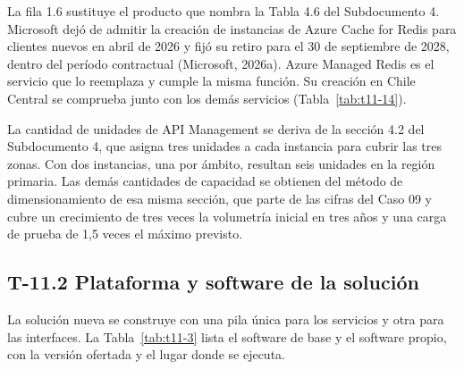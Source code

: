 \documentclass[11pt]{article}
\begin{document}
La fila 1.6 sustituye el producto que nombra la Tabla 4.6 del Subdocumento 4. Microsoft dejó de admitir la creación de instancias de Azure Cache for Redis para clientes nuevos en abril de 2026 y fijó su retiro para el 30 de septiembre de 2028, dentro del período contractual (Microsoft, 2026a). Azure Managed Redis es el servicio que lo reemplaza y cumple la misma función. Su creación en Chile Central se comprueba junto con los demás servicios (Tabla~\mbox{\ref{tab:t11-14}}).

La cantidad de unidades de API Management se deriva de la sección 4.2 del Subdocumento 4, que asigna tres unidades a cada instancia para cubrir las tres zonas. Con dos instancias, una por ámbito, resultan seis unidades en la región primaria. Las demás cantidades de capacidad se obtienen del método de dimensionamiento de esa misma sección, que parte de las cifras del Caso 09 y cubre un crecimiento de tres veces la volumetría inicial en tres años y una carga de prueba de 1,5 veces el máximo previsto.

\subsection{T-11.2 Plataforma y software de la solución}\label{t-11-2}

La solución nueva se construye con una pila única para los servicios y otra para las interfaces. La Tabla~\mbox{\ref{tab:t11-3}} lista el software de base y el software propio, con la versión ofertada y el lugar donde se ejecuta.
\end{document}
